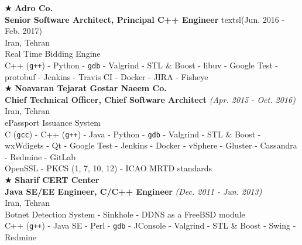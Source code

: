 \documentclass[10pt,a4paper]{article}
\begin{document}
\noindent $\bigstar$ \hspace{0.1cm} \large \textbf{Adro Co.} \\
\indent \small \textbf{Senior Software Architect, Principal C++ Engineer} textsl{(Jun. 2016 - Feb. 2017)} \\
\indent \textnormal{Iran, Tehran} \\
\indent \textbullet \hspace{0.05cm} Real Time Bidding Engine \\
\indent \textbullet \hspace{0.05cm} C++ (\texttt{g++}) - Python - \texttt{gdb} - Valgrind - STL \& Boost - libuv - Google Test - protobuf - Jenkins - Travis CI - Docker - JIRA - Fisheye \\

\noindent $\bigstar$ \hspace{0.1cm} \large \textbf{Noavaran Tejarat Gostar Naeem Co.} \\
\indent \small \textbf{Chief Technical Officer, Chief Software Architect} \textsl{(Apr. 2015 - Oct. 2016)} \\
\indent \textnormal{Iran, Tehran} \\
\indent \textbullet \hspace{0.05cm} ePassport Issuance System \\
\indent \textbullet \hspace{0.05cm} C (\texttt{gcc}) - C++ (\texttt{g++}) - Java - Python - \texttt{gdb} - Valgrind - STL \& Boost - wxWdigets - Qt - Google Test - Jenkins - Docker - vSphere - Gluster - Cassandra - Redmine - GitLab \\
\indent \textbullet \hspace{0.05cm} OpenSSL - PKCS (1, 7, 10, 12) - ICAO MRTD standards \\

\noindent $\bigstar$ \hspace{0.1cm} \large \textbf{Sharif CERT Center} \\ 
\indent \small \textbf{Java SE/EE Engineer, C/C++ Engineer} \textsl{(Dec. 2011 - Jun. 2013)} \\
\indent \textnormal{Iran, Tehran} \\ 
\indent \textbullet \hspace{0.05cm} Botnet Detection System - Sinkhole - DDNS as a FreeBSD module \\
\indent \textbullet \hspace{0.05cm} C++ (\texttt{g++}) - Java SE - Perl - \texttt{gdb} - JConsole - Valgrind - STL \& Boost - Swing - Redmine \\
\end{document}
